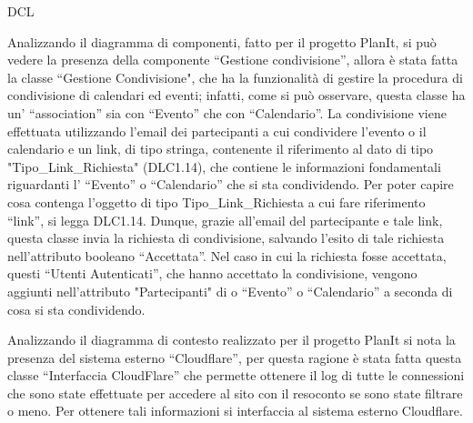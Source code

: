 \begin{listaPersonale}{DCL}
\begin{listaPersonale2}[DCL]{}
        Analizzando il diagramma di componenti, fatto per il progetto PlanIt, si può vedere la presenza della componente “Gestione condivisione”, allora è stata fatta la classe “Gestione Condivisione", che ha la funzionalità di gestire la procedura di condivisione di calendari ed eventi; infatti, come si può osservare, questa classe ha un’ “association” sia con “Evento” che con “Calendario”.  La condivisione viene effettuata utilizzando l’email dei partecipanti a cui condividere l’evento o il calendario e un link, di tipo stringa, contenente il riferimento al dato di tipo "Tipo\_Link\_Richiesta" (DLC1.14), che contiene le informazioni fondamentali riguardanti l’ “Evento” o “Calendario” che si sta condividendo. Per poter capire cosa contenga l’oggetto di tipo Tipo\_Link\_Richiesta a cui fare riferimento “link”, si legga DLC1.14. Dunque, grazie all’email del partecipante e tale link, questa classe invia la richiesta di condivisione, salvando l’esito di tale richiesta nell’attributo booleano “Accettata”. Nel caso in cui la richiesta fosse accettata, questi “Utenti Autenticati”, che hanno accettato la condivisione, vengono aggiunti nell’attributo "Partecipanti" di o “Evento” o “Calendario” a seconda di cosa si sta condividendo.
        \begin{comment}
            \begin{center}
                \\
                \blfootnote{Immagine \href{https://github.com/Life-planner/Documentazione/blob/main/D3/img/Diagrammi/png/path/to/img.png}{PNG}/\href{https://github.com/Life-planner/Documentazione/blob/main/D3/img/Diagrammi/svg/path/to/img.svg}{SVG} nome file}
            \end{center}
        \end{comment}

    \end{listaPersonale2}



    Analizzando il diagramma di contesto realizzato per il progetto PlanIt si nota la presenza del sistema esterno “Cloudflare”, per questa ragione è stata fatta questa classe “Interfaccia CloudFlare” che permette ottenere il log di tutte le connessioni che sono state effettuate per accedere al sito con il resoconto se sono state filtrare o meno. Per ottenere tali informazioni si interfaccia al sistema esterno Cloudflare.
    \begin{comment}
        \begin{center}
            \\
            \blfootnote{Immagine \href{https://github.com/Life-planner/Documentazione/blob/main/D3/img/Diagrammi/png/path/to/img.png}{PNG}/\href{https://github.com/Life-planner/Documentazione/blob/main/D3/img/Diagrammi/svg/path/to/img.svg}{SVG} nome file}
        \end{center}
    \end{comment}




\end{listaPersonale}
